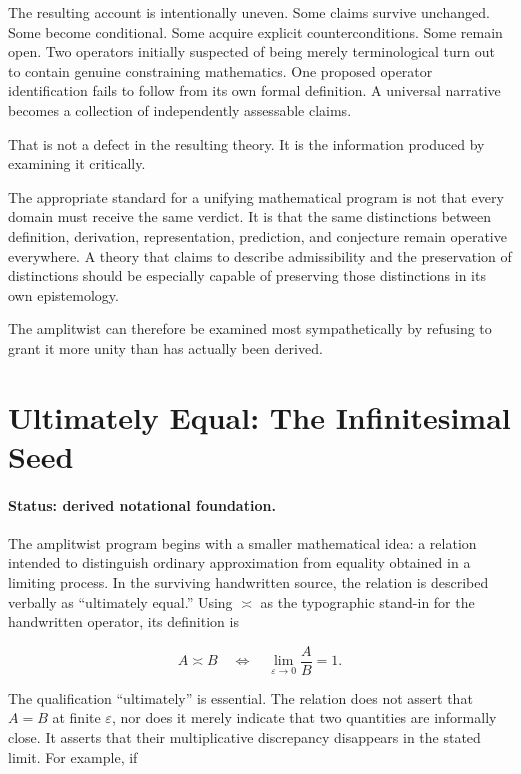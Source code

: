 \documentclass[11pt]{article}
\newcommand{\ulteq}{\mathrel{\text{≍}}}
\begin{document}
The resulting account is intentionally uneven. Some claims survive unchanged. Some become conditional. Some acquire explicit counterconditions. Some remain open. Two operators initially suspected of being merely terminological turn out to contain genuine constraining mathematics. One proposed operator identification fails to follow from its own formal definition. A universal narrative becomes a collection of independently assessable claims.

That is not a defect in the resulting theory. It is the information produced by examining it critically.

The appropriate standard for a unifying mathematical program is not that every domain must receive the same verdict. It is that the same distinctions between definition, derivation, representation, prediction, and conjecture remain operative everywhere. A theory that claims to describe admissibility and the preservation of distinctions should be especially capable of preserving those distinctions in its own epistemology.

The amplitwist can therefore be examined most sympathetically by refusing to grant it more unity than has actually been derived.

\section{Ultimately Equal: The Infinitesimal Seed}

\paragraph{Status: derived notational foundation.}

The amplitwist program begins with a smaller mathematical idea: a relation intended to distinguish ordinary approximation from equality obtained in a limiting process. In the surviving handwritten source, the relation is described verbally as ``ultimately equal.'' Using $\ulteq$ as the typographic stand-in for the handwritten operator, its definition is

\begin{equation}
A \ulteq B
\quad\Longleftrightarrow\quad
\lim_{\varepsilon\to 0}\frac{A}{B}=1.
\end{equation}

The qualification ``ultimately'' is essential. The relation does not assert that $A=B$ at finite $\varepsilon$, nor does it merely indicate that two quantities are informally close. It asserts that their multiplicative discrepancy disappears in the stated limit. For example, if
\end{document}

